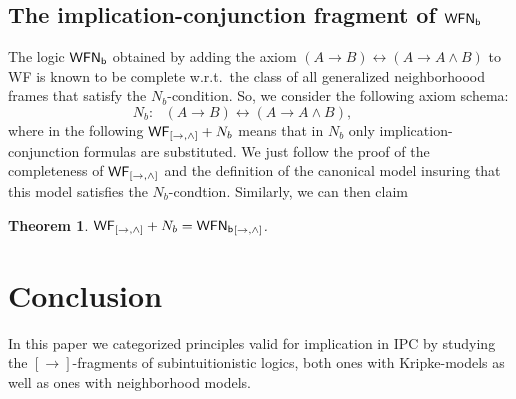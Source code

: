 \documentclass[12pt]{article}
\newtheorem{thm}{Theorem}[section]
\newtheorem{lem}[thm]{Lemma}
\begin{document}
\subsection{The implication-conjunction fragment of $  {\sf WFN_{b}}$}
The logic $ {\sf WFN_{b}} $ obtained by adding the axiom $(A\rightarrow B)\leftrightarrow (A \rightarrow A \wedge B)$  to {\sf WF} is known to be complete w.r.t.\ the class of all generalized neighborhoood frames that satisfy the $  N_{b}$-condition. 
So, we consider the following axiom schema:
$$  N_{b}:~~~ (A\rightarrow B)\leftrightarrow (A \rightarrow A \wedge B),~~~~~~~~~~~$$
where in the following ${\sf WF}_{[\rightarrow, \wedge]}+N_{b}$ means that in $  N_{b}$ only implication-conjunction formulas are substituted.
We just follow the proof of the completeness of $ {\sf WF_{[\rightarrow, \wedge]}} $ and the definition of the canonical model insuring that this model satisfies the $N_{b}$-condtion. Similarly,  we can then claim

\begin{thm}
${\sf WF}_{[\rightarrow, \wedge]}+ N_{b}={\sf WFN_{b}}_{[\rightarrow, \wedge]}$.
\end{thm}

\section{Conclusion} In this paper we categorized principles valid for implication in {\sf IPC} by studying the $[\rightarrow]$-fragments of subintuitionistic logics, both ones with Kripke-models as well as ones with neighborhood models.



\label{references}
\
\end{document}
